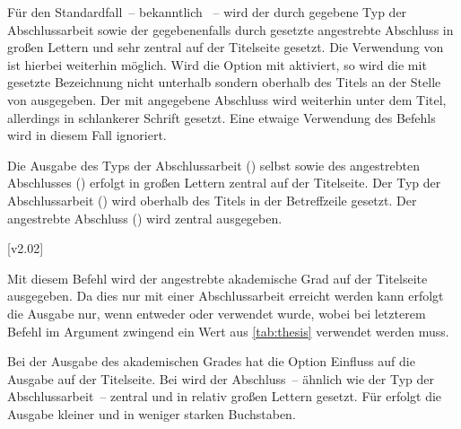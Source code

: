\begin{DeclareEntity*}{}
\begin{DeclareEntity*}{}
\begin{DeclareEntity*}{}
\begin{Declaration}
Für den Standardfall~-- bekanntlich ~-- wird der 
durch  gegebene Typ der Abschlussarbeit sowie der gegebenenfalls 
durch  gesetzte angestrebte Abschluss in großen Lettern und 
sehr zentral auf der Titelseite gesetzt. Die Verwendung von  ist 
hierbei weiterhin möglich.
%
Wird die Option mit  aktiviert, so wird die mit 
 gesetzte Bezeichnung nicht unterhalb sondern oberhalb des Titels 
an der Stelle von  ausgegeben. Der mit  
angegebene Abschluss wird weiterhin unter dem Titel, allerdings in schlankerer 
Schrift gesetzt. Eine etwaige Verwendung des Befehls  wird in 
diesem Fall ignoriert.
\begin{DeclareValues}{}
  Die Ausgabe des Typs der Abschlussarbeit () selbst sowie des 
  angestrebten Abschlusses () erfolgt in großen Lettern 
  zentral auf der Titelseite.
  Der Typ der Abschlussarbeit () wird oberhalb des Titels in der 
  Betreffzeile gesetzt. Der angestrebte Abschluss () wird 
  zentral ausgegeben.
\end{DeclareValues}
\end{Declaration}

\begin{Declaration}
  {}
  [v2.02]
\printdeclarationlist

Mit diesem Befehl wird der angestrebte akademische Grad auf der Titelseite 
ausgegeben. Da dies nur mit einer Abschlussarbeit erreicht werden kann erfolgt 
die Ausgabe nur, wenn entweder  oder  verwendet 
wurde, wobei bei letzterem Befehl im Argument zwingend ein Wert aus 
\autoref{tab:thesis} verwendet werden muss.

Bei der Ausgabe des akademischen Grades hat die Option  
Einfluss auf die Ausgabe auf der Titelseite. Bei  
wird der Abschluss~-- ähnlich wie der Typ der Abschlussarbeit~-- zentral und in 
relativ großen Lettern gesetzt. Für  erfolgt die 
Ausgabe kleiner und in weniger starken Buchstaben.
\end{Declaration}

\begin{Declaration}
  {}
\begin{Declaration}
  {}
\begin{Declaration}
  {}
\begin{Declaration}
  {}


\end{Declaration}
\end{Declaration}
\end{Declaration}
\end{Declaration}
\end{DeclareEntity*}
\end{DeclareEntity*}
\end{DeclareEntity*}
